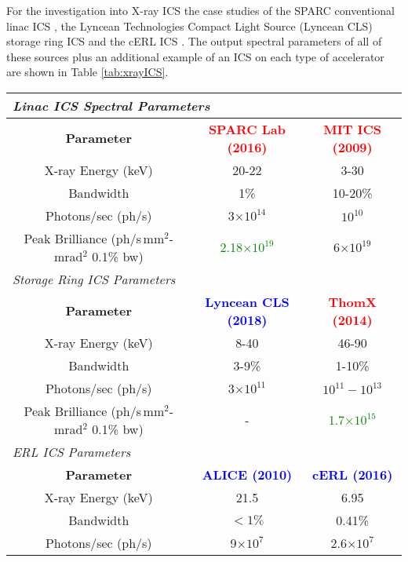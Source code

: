 \documentclass[11pt]{article}
\begin{document}
For the investigation into X-ray ICS the case studies of the SPARC conventional linac ICS \cite{SPARCstatus}, the Lyncean Technologies Compact Light Source (Lyncean CLS) \cite{LynceanCLS} storage ring ICS and the cERL ICS \cite{TAkagicERL}. The output spectral parameters of all of these sources plus an additional example of an ICS on each type of accelerator are shown in Table \ref{tab:xrayICS}.  
      
\begin{table}[H]
\centering
\begin{tabular}{|c||c|c|}
\hline
\multicolumn{3}{|l|}{\textit{Linac ICS Spectral Parameters}} \\
\hline
\textbf{Parameter} & \textcolor{red}{\textbf{SPARC Lab (2016)}} \cite{SPARC} & \textcolor{red}{\textbf{MIT ICS (2009)}} \cite{MITICS} \\
\hline
X-ray Energy (keV) & 20-22 & 3-30 \\
\hline
Bandwidth & 1\% & 10-20\% \\
\hline
Photons/sec (ph/s) & 3$\times 10^{14}$ & $10^{10}$ \\
\hline
Peak Brilliance (ph/s\,mm$^{2}$-mrad$^{2}$ 0.1\% bw) & \textcolor{green}{2.18$\times10^{19}$} & 6$\times 10^{19}$ \\
\hline
\hline
\multicolumn{3}{|l|}{\textit{Storage Ring ICS Parameters}} \\
\hline
\textbf{Parameter} & \textcolor{blue}{\textbf{Lyncean CLS (2018)}} \cite{LynceanCLS} & \textcolor{red}{\textbf{ThomX (2014)}} \cite{ThomXTDR} \\
\hline
X-ray Energy (keV) & 8-40 & 46-90 \\
\hline
Bandwidth & 3-9\% & 1-10\% \\
\hline
Photons/sec (ph/s) & 3$\times 10^{11}$ & $10^{11}-10^{13}$ \\
\hline
Peak Brilliance (ph/s\,mm$^{2}$-mrad$^{2}$ 0.1\% bw) & - & \textcolor{green}{1.7$\times 10^{15}$} \\
\hline
\hline
\multicolumn{3}{|l|}{\textit{ERL ICS Parameters}} \\
\hline
\textbf{Parameter} & \textcolor{blue}{\textbf{ALICE (2010)}} \cite{ALICEICS1} & \textcolor{blue}{\textbf{cERL (2016)}} \cite{TAkagicERL} \\
\hline
X-ray Energy (keV) & 21.5 & 6.95 \\
\hline
Bandwidth & $ < 1\%$ & 0.41\% \\
\hline
Photons/sec (ph/s) & 9$\times 10^{7}$ & 2.6$\times 10^{7}$ \\
\hline

\end{tabular}
\end{table}
\end{document}
